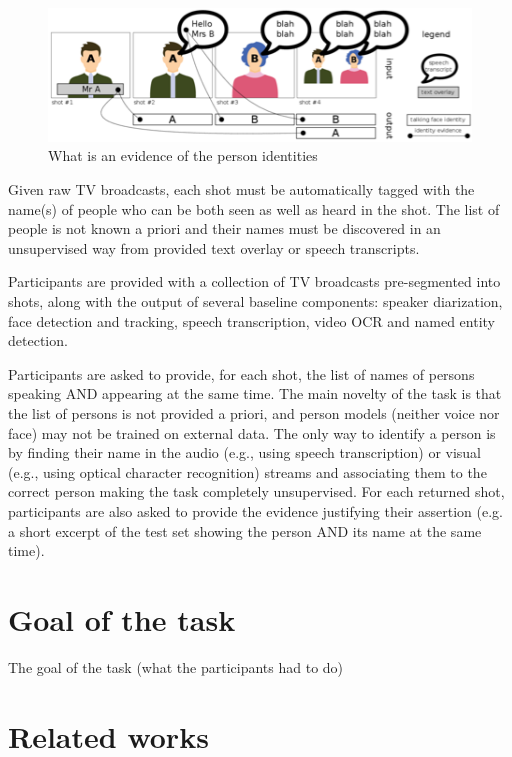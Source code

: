 \documentclass{acm_proc_article-me}
\begin{document}
\begin{figure}[t]
 \center 
 \includegraphics[width=1\linewidth]{figs/evidence.png}
 \centering
 \caption {What is an evidence of the person identities}
 \label{fig:evidence}
\end{figure}

Given raw TV broadcasts, each shot must be automatically tagged with the name(s) of people who can be both seen as well as heard in the shot. The list of people is not known a priori and their names must be discovered in an unsupervised way from provided text overlay or speech transcripts. 

Participants are provided with a collection of TV broadcasts pre-segmented into shots, along with the output of several baseline components: speaker diarization, face detection and tracking, speech transcription, video OCR and named entity detection. 

Participants are asked to provide, for each shot, the list of names of persons speaking AND appearing at the same time. The main novelty of the task is that the list of persons is not provided a priori, and person models (neither voice nor face) may not be trained on external data. The only way to identify a person is by finding their name in the audio (e.g., using speech transcription) or visual (e.g., using optical character recognition) streams and associating them to the correct person making the task completely unsupervised. For each returned shot, participants are also asked to provide the evidence justifying their assertion (e.g. a short excerpt of the test set showing the person AND its name at the same time).


\section{Goal of the task}

The goal of the task (what the participants had to do)

\section{Related works}
\end{document}
